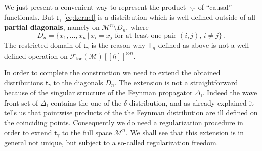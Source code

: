 \documentclass[12pt]{book}
\newcommand{\loc}{\mathsf{loc}}
\newcommand{\Mcal}{\mathcal{M}}
\newcommand{\Tsf}{\mathsf{T}}
\newcommand{\fsf}{\mathsf{f}}
\newcommand{\tsf}{\mathsf{t}}
\theoremstyle{break}
\begin{document}
\bigskip

We just present a convenient way to represent the product $\cdot_T$ of ``causal'' functionals. But $\tsf_\gamma$ \eqref{eq:kernel} is a distribution which is well defined outside of all \textbf{partial diagonals}, namely on $\Mcal^n\setminus D_n$, where 
%
\begin{equation}
D_n = \{x_1,\ldots,x_n\,|\, x_i=x_j \text{ for at least one pair } (i,j),\, i\neq j \} \ .
\label{eq:all_diagonals}
\end{equation}
%
The restricted domain of $\tsf_\gamma$ is the reason why $\Tsf_n$ defined as above is not a well defined operation on $\mathcal{F}_\loc(\Mcal)[[\hbar]]^{\otimes n}$. 


In order to complete the construction we need to extend the obtained distributions $\tsf_\gamma$ to the diagonals $D_n$. The extension is not a straightforward because of the singular structure of the Feynman propagator $\Delta_\fsf$. Indeed the wave front set of $\Delta_\fsf$ contains the one of the $\delta$ distribution, and as already explained it tells us that pointwise products of the the Feynman distribution are ill defined on the coinciding points. Consequently we do need a regularization procedure in order to extend $\tsf_\gamma$ to the full space $\Mcal^n$. We shall see that this extension is in general not unique, but subject to a so-called regularization freedom.


\bigskip
\end{document}
